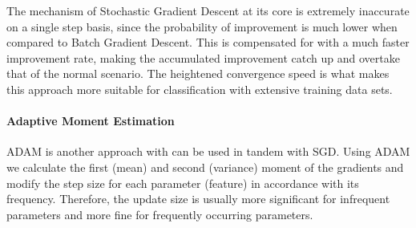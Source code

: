 		\par
		
		The mechanism of Stochastic Gradient Descent at its core is extremely inaccurate on a single step basis, since the probability of improvement is much lower when compared to Batch Gradient Descent. This is compensated for with a much faster improvement rate, making the accumulated improvement catch up and overtake that of the normal scenario. The heightened convergence speed is what makes this approach more suitable for classification with extensive training data sets.
		
		\paragraph{Adaptive Moment Estimation}
			ADAM is another approach with can be used in tandem with SGD. Using ADAM we calculate the first (mean) and second (variance) moment of the gradients and modify the step size for each parameter (feature) in accordance with its frequency. Therefore, the update size is usually more significant for infrequent parameters and more fine for frequently occurring parameters.
			
		 

				
				